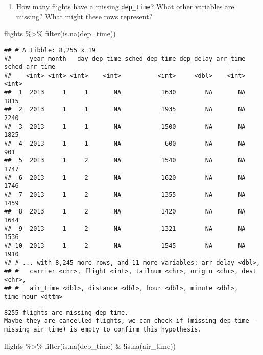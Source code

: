 \documentclass[
]{article}
\newenvironment{Shaded}{\begin{snugshade}}{\end{snugshade}}
\newcommand{\FunctionTok}[1]{\textcolor[rgb]{0.00,0.00,0.00}{#1}}
\newcommand{\NormalTok}[1]{#1}
\newcommand{\SpecialCharTok}[1]{\textcolor[rgb]{0.00,0.00,0.00}{#1}}
\providecommand{\tightlist}{%
  \setlength{\itemsep}{0pt}\setlength{\parskip}{0pt}}
\begin{document}
\begin{enumerate}
\def\labelenumi{\arabic{enumi}.}
\setcounter{enumi}{2}
\tightlist
\item
  How many flights have a missing \texttt{dep\_time}? What other
  variables are missing? What might these rows represent?
\end{enumerate}

\begin{Shaded}
\begin{Highlighting}[]
\NormalTok{flights }\SpecialCharTok{\%\textgreater{}\%} \FunctionTok{filter}\NormalTok{(}\FunctionTok{is.na}\NormalTok{(dep\_time))}
\end{Highlighting}
\end{Shaded}

\begin{verbatim}
## # A tibble: 8,255 x 19
##     year month   day dep_time sched_dep_time dep_delay arr_time sched_arr_time
##    <int> <int> <int>    <int>          <int>     <dbl>    <int>          <int>
##  1  2013     1     1       NA           1630        NA       NA           1815
##  2  2013     1     1       NA           1935        NA       NA           2240
##  3  2013     1     1       NA           1500        NA       NA           1825
##  4  2013     1     1       NA            600        NA       NA            901
##  5  2013     1     2       NA           1540        NA       NA           1747
##  6  2013     1     2       NA           1620        NA       NA           1746
##  7  2013     1     2       NA           1355        NA       NA           1459
##  8  2013     1     2       NA           1420        NA       NA           1644
##  9  2013     1     2       NA           1321        NA       NA           1536
## 10  2013     1     2       NA           1545        NA       NA           1910
## # ... with 8,245 more rows, and 11 more variables: arr_delay <dbl>,
## #   carrier <chr>, flight <int>, tailnum <chr>, origin <chr>, dest <chr>,
## #   air_time <dbl>, distance <dbl>, hour <dbl>, minute <dbl>, time_hour <dttm>
\end{verbatim}

\begin{verbatim}
8255 flights are missing dep_time.
Maybe they are cancelled flights, we can check if (missing dep_time - missing air_time) is empty to confirm this hypothesis.
\end{verbatim}

\begin{Shaded}
\begin{Highlighting}[]
\NormalTok{flights }\SpecialCharTok{\%\textgreater{}\%} \FunctionTok{filter}\NormalTok{(}\FunctionTok{is.na}\NormalTok{(dep\_time) }\SpecialCharTok{\&} \SpecialCharTok{!}\FunctionTok{is.na}\NormalTok{(air\_time))}
\end{Highlighting}
\end{Shaded}
\end{document}
